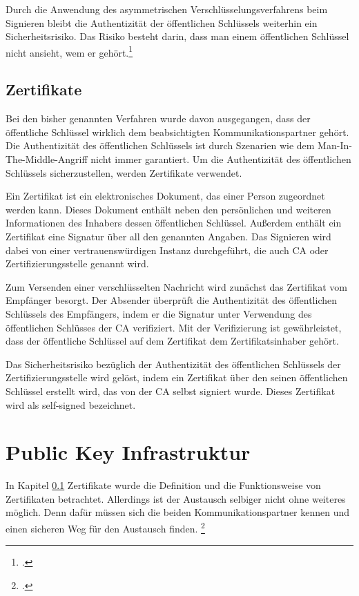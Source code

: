 \documentclass  [paper=a4,
				fontsize=12pt,
				listof=totoc,
				bibliography=totoc
				]{scrreprt}
\begin{document}
				Durch die Anwendung des asymmetrischen Verschlüsselungsverfahrens beim Signieren bleibt die Authentizität der öffentlichen Schlüssels weiterhin ein Sicherheitsrisiko. Das Risiko besteht darin, dass	\glqq man einem öffentlichen Schlüssel nicht ansieht, wem er gehört\grqq{}.\footcite[S. 506]{Schmeh2013}
	
			\subsection{Zertifikate}\label{chp: zertifikate}
				Bei den bisher genannten Verfahren wurde davon ausgegangen, dass der öffentliche Schlüssel wirklich dem beabsichtigten Kommunikationspartner gehört. Die Authentizität des öffentlichen Schlüssels ist durch Szenarien wie dem Man-In-The-Middle-Angriff nicht immer garantiert. Um die Authentizität des öffentlichen Schlüssels sicherzustellen, werden Zertifikate verwendet.
				
				Ein Zertifikat ist ein elektronisches Dokument, das einer Person zugeordnet werden kann. Dieses Dokument enthält neben den persönlichen und weiteren Informationen des Inhabers dessen öffentlichen Schlüssel. Außerdem enthält ein Zertifikat eine Signatur über all den genannten Angaben. Das Signieren wird dabei von einer vertrauenswürdigen Instanz durchgeführt, die auch \ac{CA} oder Zertifizierungsstelle genannt wird.
				
				Zum Versenden einer verschlüsselten Nachricht wird zunächst das Zertifikat vom Empfänger besorgt. Der Absender überprüft die Authentizität des öffentlichen Schlüssels des Empfängers, indem er die Signatur unter Verwendung des öffentlichen Schlüsses der \ac{CA} verifiziert. Mit der Verifizierung ist gewährleistet, dass der öffentliche Schlüssel auf dem Zertifikat dem Zertifikatsinhaber gehört.
				
				Das Sicherheitsrisiko bezüglich der Authentizität des öffentlichen Schlüssels der Zertifizierungsstelle wird gelöst, indem ein Zertifikat über den seinen öffentlichen Schlüssel erstellt wird, das von der \ac{CA} selbst signiert wurde. Dieses Zertifikat wird als self-signed bezeichnet.
	
		\section{Public Key Infrastruktur}
			In Kapitel \ref*{chp: zertifikate} Zertifikate wurde die Definition und die Funktionsweise von Zertifikaten betrachtet. Allerdings ist der Austausch selbiger nicht ohne weiteres möglich. Denn dafür müssen sich die beiden Kommunikationspartner \glqq kennen und einen sicheren Weg für den Austausch finden\grqq{}. \footcite[Vgl.][]{BSI}\medskip\\
			
\end{document}
